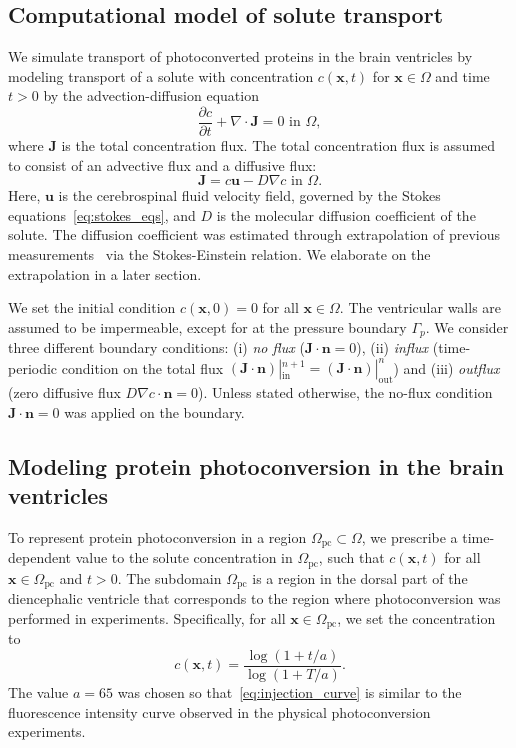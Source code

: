\documentclass[fleqn]{wlscirep}
\newcommand{\pdifft}[1]{\frac{\partial  #1}{\partial t}}
\newcommand{\nn}{\mathbf{n}}
\newcommand{\uu}{\mathbf{u}}
\newcommand{\xx}{\bm{x}}
\newcommand{\JJ}{\mathbf{J}}
\begin{document}
\subsection*{Computational model of solute transport}
We simulate transport of photoconverted proteins in the brain ventricles by modeling transport of a solute with concentration $c(\xx, t)$ for $\xx\in\Omega$ and time $t > 0$ by the advection-diffusion equation
\begin{equation}
    \pdifft{c} + \nabla\cdot\JJ = 0\mbox{  in }\Omega,
    \label{eq:adv_diff_strong}
\end{equation}
where $\mathbf{J}$ is the total concentration flux. The total concentration flux is assumed to consist of an advective flux and a diffusive flux:
\begin{equation*}
    \JJ = c\uu - D\nabla c\mbox{ in }\Omega.
\end{equation*}
Here, $\uu$ is the cerebrospinal fluid velocity field, governed by the Stokes equations~\eqref{eq:stokes_eqs}, and $D$ is the molecular diffusion coefficient of the solute. The diffusion coefficient was estimated through extrapolation of previous measurements~\cite{GuraSadovsky2017MeasurementExpansion, Mahmood2023ExosomeTemperature, Swaminathan1997PhotobleachingDiffusion, Potma2001ReducedCells} via the Stokes-Einstein relation. We elaborate on the extrapolation in a later section.

We set the initial condition $c(\xx, 0)=0$ for all $\xx\in\Omega$. The ventricular walls are assumed to be impermeable, except for at the pressure boundary $\Gamma_p$. We consider three different boundary conditions: (i) \emph{no flux} ($\JJ\cdot\nn=0$), (ii) \emph{influx} (time-periodic condition on the total flux $(\JJ\cdot\nn)|_{\mathrm{in}}^{n+1}=(\JJ\cdot\nn)|_{\mathrm{out}}^{n}$) and (iii) \emph{outflux} (zero diffusive flux $D\nabla c\cdot\nn=0$). Unless stated otherwise, the no-flux condition $\JJ\cdot\nn=0$ was applied on the boundary.
\subsection*{Modeling protein photoconversion in the brain ventricles}
To represent protein photoconversion in a region $\Omega_{\mathrm{pc}}\subset\Omega$, we prescribe a time-dependent value to the solute concentration in $\Omega_{\mathrm{pc}}$, such that $c(\xx, t)$ for all $\xx\in\Omega_{\mathrm{pc}}$ and $t>0$. The subdomain $\Omega_{\mathrm{pc}}$ is a region in the dorsal part of the diencephalic ventricle that corresponds to the region where photoconversion was performed in experiments. Specifically, for all $\xx\in\Omega_{\mathrm{pc}}$, we set the concentration to 
\begin{equation}
c(\xx, t)=\frac{\log{(1+t/a)}}{\log{(1+T/a)}}.
\label{eq:injection_curve}
\end{equation}
The value $a=65$ was chosen so that~\eqref{eq:injection_curve} is similar to the fluorescence intensity curve observed in the physical photoconversion experiments.
\end{document}
